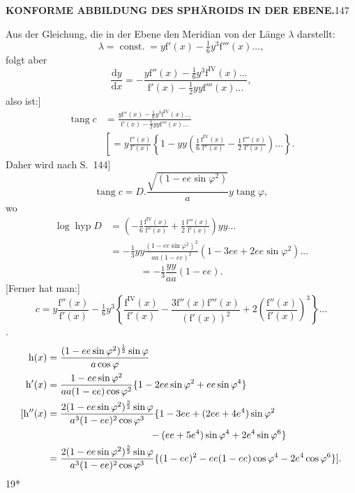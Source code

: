 \par\clearpage
\noindent\null\hfill{\small\textbf{KONFORME ABBILDUNG DES SPHÄROIDS IN DER EBENE.}}\hfill147\par\medskip
Aus der Gleichung, die in der Ebene den Meridian von der Länge \(\lambda\) darstellt:
\[\lambda=\operatorname{const.}=y\mathrm f'(x)-\tfrac16y^3\mathrm f'''(x)\ldots,\]
\noindent folgt aber
\[\frac{\mathrm dy}{\mathrm dx}=-\frac{y\mathrm f''(x)-\tfrac16y^3\mathrm f^{\mathrm{IV}}(x)\ldots}{\mathrm f'(x)-\tfrac12yy\mathrm f'''(x)\ldots},\]
\noindent also ist:]
\[
\begin{aligned}
\operatorname{tang}c&=\frac{y\mathrm f''(x)-\tfrac16y^3\mathrm f^{\mathrm{IV}}(x)\ldots}{\mathrm f'(x)-\tfrac12yy\mathrm f'''(x)\ldots}\\
&\left[=y\frac{\mathrm f''(x)}{\mathrm f'(x)}\left\{1-yy\left(\tfrac16\frac{\mathrm f^{\mathrm{IV}}(x)}{\mathrm f''(x)}-\tfrac12\frac{\mathrm f'''(x)}{\mathrm f'(x)}\right)\ldots\right\}. \right.
\end{aligned}
\]
Daher wird nach S.~144]
\[\operatorname{tang}c=D.\frac{\sqrt{(1-ee\sin\varphi^2)}}a y\operatorname{tang}\varphi,\]
\noindent wo
\[
\begin{aligned}
\log\operatorname{hyp}D&=\left(-\tfrac16\frac{\mathrm f^{\mathrm{IV}}(x)}{\mathrm f''(x)}+\tfrac12\frac{\mathrm f'''(x)}{\mathrm f'(x)}\right)yy\ldots\\
&=-\tfrac13yy\frac{(1-ee\sin\varphi^2)^2}{aa(1-ee)^2}(1-3ee+2ee\sin\varphi^2)\ldots
\end{aligned}
\]
\[=-\tfrac13\frac{yy}{aa}(1-ee).\]
[Ferner hat man:]
\[c=y\frac{\mathrm f''(x)}{\mathrm f'(x)}-\tfrac16y^3\left\{\frac{\mathrm f^{\mathrm{IV}}(x)}{\mathrm f'(x)}-\frac{3\mathrm f''(x)\mathrm f'''(x)}{(\mathrm f'(x))^2}+2\left(\frac{\mathrm f''(x)}{\mathrm f'(x)}\right)^3\right\}\ldots\]
.\]
\[
\begin{aligned}
\mathrm h(x)&=\frac{(1-ee\sin\varphi^2)^{\frac12}\sin\varphi}{a\cos\varphi}\\
\mathrm h'(x)&=\frac{1-ee\sin\varphi^2}{aa(1-ee)\cos\varphi^2}\{1-2ee\sin\varphi^2+ee\sin\varphi^4\}\\
{[}\mathrm h''(x)&=\frac{2(1-ee\sin\varphi^2)^{\frac32}\sin\varphi}{a^3(1-ee)^2\cos\varphi^3}\{1-3ee+(2ee+4e^4)\sin\varphi^2\\
&\hspace{37mm}-(ee+5e^4)\sin\varphi^4+2e^4\sin\varphi^6\}\\
&=\frac{2(1-ee\sin\varphi^2)^{\frac32}\sin\varphi}{a^3(1-ee)^2\cos\varphi^3}\{(1-ee)^2-ee(1-ee)\cos\varphi^4-2e^4\cos\varphi^6\}].
\end{aligned}
\]
\noindent\hfill{\small19*}\par

